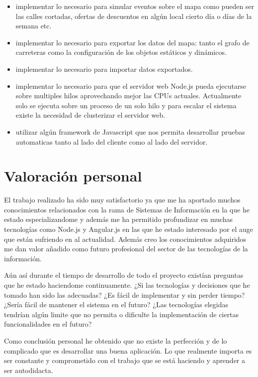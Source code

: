 \begin{itemize}
	\item implementar lo necesario para simular eventos sobre el mapa como pueden ser las calles cortadas, ofertas de descuentos en algún local cierto día o días de la semana etc.
	\item implementar lo necesario para exportar los datos del mapa: tanto el grafo de carreteras como la configuración de los objetos estáticos y dinámicos.
	\item implementar lo necesario para importar datos exportados.
	\item implementar lo necesario para que el servidor web Node.js pueda ejecutarse sobre multiples hilos aprovechando mejor las CPUs actuales. Actualmente solo se ejecuta sobre un proceso de un solo hilo y para escalar el sistema existe la necesidad de clusterizar el servidor web.
	\item utilizar algún framework de Javascript que nos permita desarrollar pruebas automaticas tanto al lado del cliente como al lado del servidor.
\end{itemize}

\section{Valoración personal}

El trabajo realizado ha sido muy satisfactorio ya que me ha aportado muchos conocimientos relacionados con la rama de Sistemas de Información en la que he estado especializandome y además me ha permitido profundizar en muchas tecnologías como Node.js y Angular.js en las que he estado interesado por el auge que están sufriendo en al actualidad. Además creo los conocimientos adquiridos me dan valor añadido como futuro profesional del sector de las tecnologías de la información.

Aún así durante el tiempo de desarrollo de todo el proyecto existían preguntas que he estado haciendome continuamente. ¿Si las tecnologías y decisiones que he tomado han sido las adecuadas? ¿Es fácil de implementar y sin perder tiempo? ¿Sería fácil de mantener el sistema en el futuro? ¿Las tecnologías elegidas tendrían algún limite que no permita o dificulte la implementación de ciertas funcionalidades en el futuro? 

Como conclusión personal he obtenido que no existe la perfección y de lo complicado que es desarrollar una buena aplicación. Lo que realmente importa es ser constante y comprometido con el trabajo que se está haciendo y aprender a ser autodidacta.